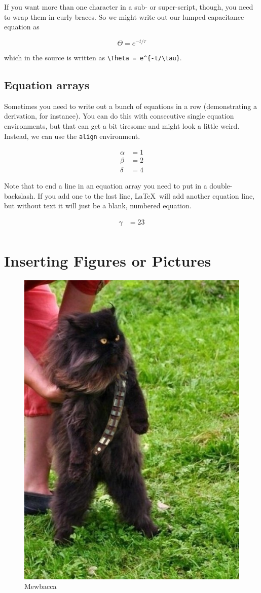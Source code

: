 \documentclass[12pt,a4paper]{article}
\begin{document}
  If you want more than one character in a sub- or super-script, though,
  you need to wrap them in curly braces.  So we might write out our
  lumped capacitance equation as

  \begin{equation}
    \Theta = e^{-t/\tau}
  \end{equation}

  which in the source is written as \verb|\Theta = e^{-t/\tau}|.
  
  \subsection{Equation arrays}
  Sometimes you need to write out a bunch of equations in a row
  (demonstrating a derivation, for instance).  You can do this with
  consecutive single equation environments, but that can get a bit
  tiresome and might look a little weird.  Instead, we can use the
  \verb|align| environment.  

  \begin{align}
    \alpha &= 1 \\
    \beta &= 2 \\ 
    \delta &= 4 
  \end{align}

  Note that to end a line in an equation array you need to put in a
  double-backslash.  If you add one to the last line, \LaTeX\ will add
  another equation line, but without text it will just be a blank,
  numbered equation.  

  \begin{align}
    \gamma &= 23 \\
  \end{align}


  \section{Inserting Figures or Pictures}
    \begin{figure}[ht]
      \centering
      \includegraphics[width=.5\textwidth]{mewbacca.jpg}
      \caption{Mewbacca \label{fig:mewbacca}}
    \end{figure}
\end{document}
